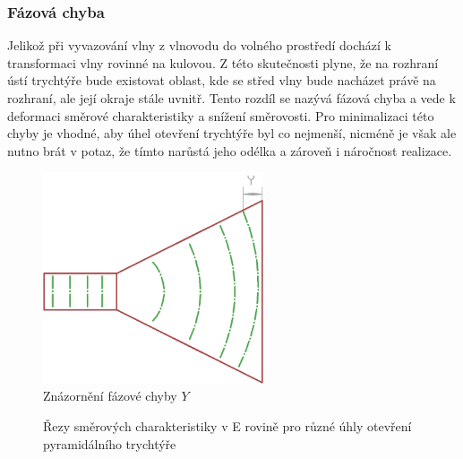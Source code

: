 \subsubsection{Fázová chyba}
Jelikož při vyvazování vlny z vlnovodu do volného prostředí dochází k transformaci vlny rovinné na kulovou. Z této skutečnosti plyne, že na rozhraní ústí trychtýře bude existovat oblast, kde se střed vlny bude nacházet právě na rozhraní, ale její okraje stále uvnitř. Tento rozdíl se nazývá fázová chyba a vede k deformaci směrové charakteristiky a snížení směrovosti. Pro minimalizaci této chyby je vhodné, aby úhel otevření trychtýře byl co nejmenší, nicméně je však ale nutno brát v potaz, že tímto narůstá jeho odélka a zároveň i náročnost realizace.
\begin{figure}[h]
\begin{center}
\includegraphics[width=6.5cm]{pics/hornErr}
\caption{Znázornění fázové chyby $Y$}
\label{fig:HornErr}
\end{center}
\end{figure}

\begin{figure}
\caption{Řezy směrových charakteristiky v E rovině pro různé úhly otevření pyramidálního trychtýře}
\label{fig:HornLenDep}
\end{figure}

